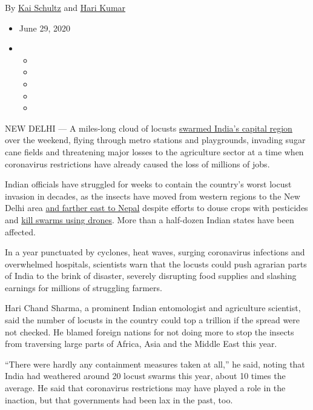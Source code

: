 By \href{https://www.nytimes.com/by/kai-schultz}{Kai Schultz} and
\href{https://www.nytimes.com/by/hari-kumar}{Hari Kumar}

\begin{itemize}
\item
  June 29, 2020
\item
  \begin{itemize}
  \item
  \item
  \item
  \item
  \item
  \end{itemize}
\end{itemize}

NEW DELHI --- A miles-long cloud of locusts
\href{https://www.ndtv.com/gurgaon-news/swarms-of-crop-destroying-desert-locusts-reach-gurugram-2253126}{swarmed
India's capital region} over the weekend, flying through metro stations
and playgrounds, invading sugar cane fields and threatening major losses
to the agriculture sector at a time when coronavirus restrictions have
already caused the loss of millions of jobs.

Indian officials have struggled for weeks to contain the country's worst
locust invasion in decades, as the insects have moved from western
regions to the New Delhi area
\href{https://myrepublica.nagariknetwork.com/news/little-damage-to-crops-by-locusts-in-nepal-ministry/}{and
farther east to Nepal} despite efforts to douse crops with pesticides
and
\href{https://www.hindustantimes.com/india-news/in-midnight-operation-jaipur-officials-use-drone-to-kill-locusts/story-SUa82z8JgkCDd3mViICtUI.html}{kill
swarms using drones}. More than a half-dozen Indian states have been
affected.

In a year punctuated by cyclones, heat waves, surging coronavirus
infections and overwhelmed hospitals, scientists warn that the locusts
could push agrarian parts of India to the brink of disaster, severely
disrupting food supplies and slashing earnings for millions of
struggling farmers.

Hari Chand Sharma, a prominent Indian entomologist and agriculture
scientist, said the number of locusts in the country could top a
trillion if the spread were not checked. He blamed foreign nations for
not doing more to stop the insects from traversing large parts of
Africa, Asia and the Middle East this year.

``There were hardly any containment measures taken at all,'' he said,
noting that India had weathered around 20 locust swarms this year, about
10 times the average. He said that coronavirus restrictions may have
played a role in the inaction, but that governments had been lax in the
past, too.

